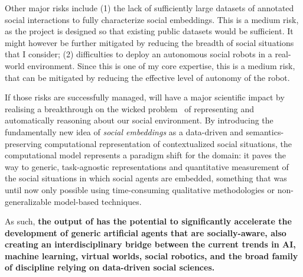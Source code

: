 Other major risks include (1) the lack of sufficiently large datasets of
annotated social interactions to fully characterize social embeddings. This is a
medium risk, as the project is designed so that existing public datasets would
be sufficient. It might however be further mitigated by reducing the breadth of
social situations that I consider; (2) difficulties to deploy an autonomous
social robots in a real-world environment. Since this is one of my core
expertise, this is a medium risk, that can be mitigated by reducing the
effective level of autonomy of the robot.

If those risks are successfully managed, \project will have a major scientific
impact by realising a breakthrough on the wicked problem~\cite{west1967wicked}
of representing and automatically reasoning about our social environment.  By
introducing the fundamentally new idea of \emph{social embeddings} as a
data-driven and semantics-preserving computational representation of
contextualized social situations, the \project computational model represents a
paradigm shift for the domain: it paves the way to generic, task-agnostic
representations and quantitative measurement of the social situations in which
social agents are embedded, something that was until now only possible using
time-consuming qualitative methodologies or non-generalizable model-based
techniques.

\begin{framed}
As such, \bf the output of \project has the potential to significantly
accelerate the development of generic artificial agents that are socially-aware,
also creating an interdisciplinary bridge between the current trends in AI, machine
learning, virtual worlds, social robotics, and the broad family of discipline relying on
data-driven social sciences.
\end{framed}


\newpage

\printbibliography



